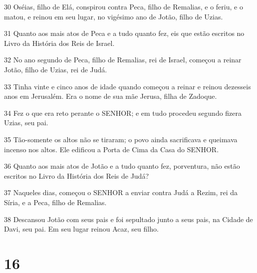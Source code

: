 \par 30 Oséias, filho de Elá, conspirou contra Peca, filho de Remalias, e o feriu, e o matou, e reinou em seu lugar, no vigésimo ano de Jotão, filho de Uzias.
\par 31 Quanto aos mais atos de Peca e a tudo quanto fez, eis que estão escritos no Livro da História dos Reis de Israel.
\par 32 No ano segundo de Peca, filho de Remalias, rei de Israel, começou a reinar Jotão, filho de Uzias, rei de Judá.
\par 33 Tinha vinte e cinco anos de idade quando começou a reinar e reinou dezesseis anos em Jerusalém. Era o nome de sua mãe Jerusa, filha de Zadoque.
\par 34 Fez o que era reto perante o SENHOR; e em tudo procedeu segundo fizera Uzias, seu pai.
\par 35 Tão-somente os altos não se tiraram; o povo ainda sacrificava e queimava incenso nos altos. Ele edificou a Porta de Cima da Casa do SENHOR.
\par 36 Quanto aos mais atos de Jotão e a tudo quanto fez, porventura, não estão escritos no Livro da História dos Reis de Judá?
\par 37 Naqueles dias, começou o SENHOR a enviar contra Judá a Rezim, rei da Síria, e a Peca, filho de Remalias.
\par 38 Descansou Jotão com seus pais e foi sepultado junto a seus pais, na Cidade de Davi, seu pai. Em seu lugar reinou Acaz, seu filho.

\chapter{16}

